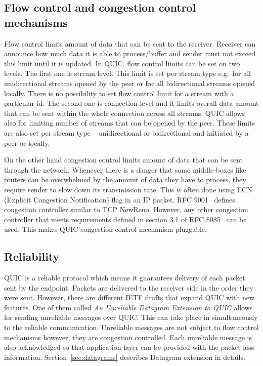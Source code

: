 \subsection{Flow control and congestion control mechanisms}
\label{subsec:flow-control-and-congestion-control}
Flow control limits amount of data that can be sent to the receiver.
Receiver can announce how much data it is able to process/buffer and sender must not exceed this limit until it is updated.
In QUIC, flow control limits can be set on two levels.
The first one is stream level.
This limit is set per stream type e.g.\ for all unidirectional streams opened by the peer or for all bidirectional streams opened locally.
There is no possibility to set flow control limit for a stream with a particular id.
The second one is connection level and it limits overall data amount that can be sent within the whole connection across all streams.
QUIC allows also for limiting number of streams that can be opened by the peer.
These limits are also set per stream type -- unidirectional or bidirectional and initiated by a peer or locally.

On the other hand congestion control limits amount of data that can be sent through the network.
Whenever there is a danger that some middle-boxes like routers can be overwhelmed by the amount of data they have to process, they require sender to slow down its transmission rate.
This is often done using ECN (Explicit Congestion Notification) flag in an IP packet.
RFC 9001~\cite{rfc9001} defines congestion controller similar to TCP NewReno.
However, any other congestion controller that meets requirements defined in section 3.1 of RFC 8085~\cite{rfc8085} can be used.
This makes QUIC congestion control mechanism pluggable.

\subsection{Reliability}
\label{subsec:reliability}
QUIC is a reliable protocol which means it guarantees delivery of each packet sent by the endpoint.
Packets are delivered to the receiver side in the order they were sent.
However, there are different IETF drafts that expand QUIC with new features.
One of them called \textit{An Unreliable Datagram Extension to QUIC}\cite{bider-ssh-quic-09} allows for sending unreliable messages over QUIC\@.
This can take place in simultaneously to the reliable communication.
Unreliable messages are not subject to flow control mechanisms however, they are congestion controlled.
Each unreliable message is also acknowledged so that application layer can be provided with the packet loss information.
Section~\ref{sec:datagrams} describes Datagram extension in details.

